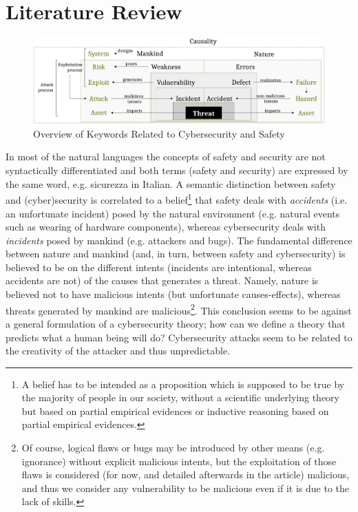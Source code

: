 \documentclass[conference]{IEEEtran}
\begin{document}
\section{Literature Review}\label{sec:literature}
\begin{figure}[t]
	\centering
	\includegraphics[width=.8\textwidth]{safety-security_3.pdf}
	\caption{Overview of Keywords Related to Cybersecurity and Safety}
	\label{fig:safety-security}
\end{figure}

In most of the natural languages the concepts of safety
and security are not syntactically differentiated and both terms (safety and
security) are expressed by the same word, e.g. sicurezza in Italian.  A
semantic distinction between safety and (cyber)security is correlated to a
belief\footnote{A belief has to be intended as a proposition which is supposed
to be true by the majority of people in our society, without a scientific
underlying theory but based on partial empirical evidences or inductive reasoning based on partial empirical evidences.} that
safety deals with \emph{accidents} (i.e. an unfortunate incident) posed by the
natural environment (e.g. natural events such as wearing of hardware
components), whereas cybersecurity deals with \emph{incidents} posed by mankind (e.g.
attackers and bugs). The fundamental difference between nature and mankind (and,
in turn, between safety and cybersecurity) is believed to be on the different
intents (incidents are intentional, whereas accidents are not) of the causes
that generates a threat. Namely, nature is believed not to have malicious
intents (but unfortunate causes-effects), whereas threats generated by mankind are
malicious\footnote{Of course, logical flaws or bugs may be
introduced by other means (e.g. ignorance) without explicit malicious intents,
but the exploitation of those flaws is considered (for now, and detailed
afterwards in the article) malicious, and thus we consider any vulnerability to
be malicious even if it is due to the lack of skills.}.
This conclusion seems to be against a general formulation of a cybersecurity theory;
how can we define a theory that predicts what a human being will do?
Cybersecurity attacks seem to be related to the creativity of the attacker
and thus unpredictable. 
\end{document}
